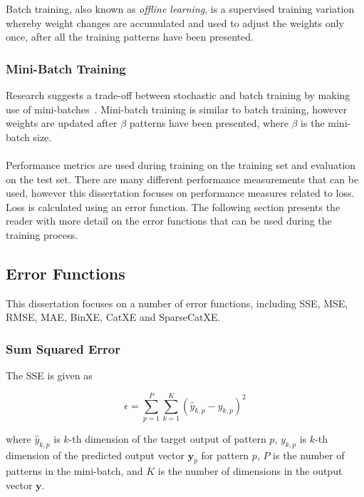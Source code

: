 Batch training, also known as \textit{offline learning}, is a supervised training variation whereby weight changes are accumulated and used to adjust the weights only once, after all the training patterns have been presented.


\subsubsection{Mini-Batch Training}\label{sec:anns:training:mini_batch}

Research suggests a trade-off between stochastic and batch training by making use of mini-batches~\cite{ref:bengio:2012}. Mini-batch training is similar to batch training, however weights are updated after $\beta$ patterns have been presented, where $\beta$ is the mini-batch size.\\
\\
Performance metrics are used during training on the training set and evaluation on the test set. There are many different performance measurements that can be used, however this dissertation focuses on performance measures related to loss. Loss is calculated using an error function. The following section presents the reader with more detail on the error functions that can be used during the training process.

\subsection{Error Functions}\label{sec:anns:training:error_functions}

This dissertation focuses on a number of error functions, including \acf{SSE}, \acf{MSE}, \acf{RMSE}, \acf{MAE}, \acf{BinXE}, \acf{CatXE} and \acf{SparseCatXE}.


\subsubsection{Sum Squared Error}\label{sec:anns:training:error_functions:sse}

The \acs{SSE} is given as

\begin{equation}
      \epsilon = \sum_{p=1}^P \sum_{k=1}^K (\hat{y}_{k,p} - y_{k,p})^2
      \label{eq:sse}
\end{equation}

where $\hat{y}_{k,p}$ is $k$-th dimension of the target output of pattern $p$, $y_{k,p}$ is $k$-th dimension of the predicted output vector $\boldsymbol{y}_{p}$ for pattern $p$, $P$ is the number of patterns in the mini-batch, and $K$ is the number of dimensions in the output vector $\boldsymbol{y}$.


